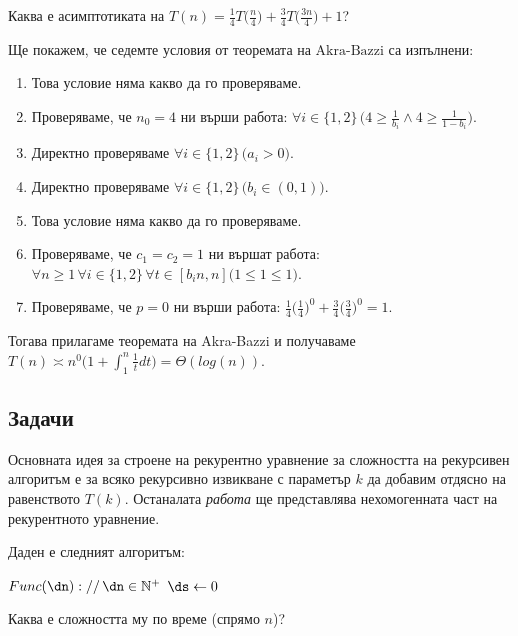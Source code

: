 \begin{problem}
Каква е асимптотиката на $T(n)=\frac14T\big(\frac n4\big)+\frac34T\big(\frac{3n}4\big)+1$? 
\end{problem}

\begin{solution}
	Ще покажем, че седемте условия от $\hyperref[th:akra-bazzi]{\text{теоремата на Akra-Bazzi}}$ са изпълнени:
	\begin{enumerate}
		\item Това условие няма какво да го проверяваме.
		\vspace{-0.15cm}
		\item Проверяваме, че $n_0=4$ ни върши работа: $\forall i\in\{1,2\}\,\Big(4\ge\frac1{b_i}\land 4\ge\frac1{1-b_i}\Big)$.
		\vspace{-0.15cm}
		\item Директно проверяваме $\forall i\in\{1,2\}\,\big(a_i>0\big)$.
		\item Директно проверяваме $\forall i\in\{1,2\}\,\big(b_i\in(0,1)\big)$.
		\item Това условие няма какво да го проверяваме.
		\item Проверяваме, че $c_1=c_2=1$ ни вършат работа: $\forall n\ge1\,\forall i\in\{1,2\}\,\forall t\in[b_in,n]\big(1\le1\le1\big)$.
		\vspace{-0.5cm}
		\item Проверяваме, че $p=0$ ни върши работа: $\frac14\big(\frac14\big)^0+\frac34\big(\frac34\big)^0=1$.
	\end{enumerate}
	\vspace{-0.2cm}
	Тогава прилагаме теоремата на Akra-Bazzi и получаваме $T(n)\asymp n^0\bigg(1+\displaystyle\int_1^n\frac1tdt\bigg)=\Theta(log(n))$.
\end{solution}\leavevmode\newline


\subsection{Задачи}

Основната идея за строене на рекурентно уравнение за сложността на рекурсивен алгоритъм е за всяко рекурсивно извикване с параметър $k$ да добавим отдясно на равенството $T(k)$. Останалата \emph{работа} ще представлява нехомогенната част на рекурентното уравнение.\\

\begin{problem}
	Даден е следният алгоритъм:
	\begin{pseudocode}
		
		
		$Func(\dn)://\,\dn\in\mathbb{N}^+$
		\Mybegin
		{
			$\ds\leftarrow0$\;
			\KwRet{$\ds$}\;
		}
	\end{pseudocode}
	Каква е сложността му по време (спрямо $n$)?
\end{problem}

